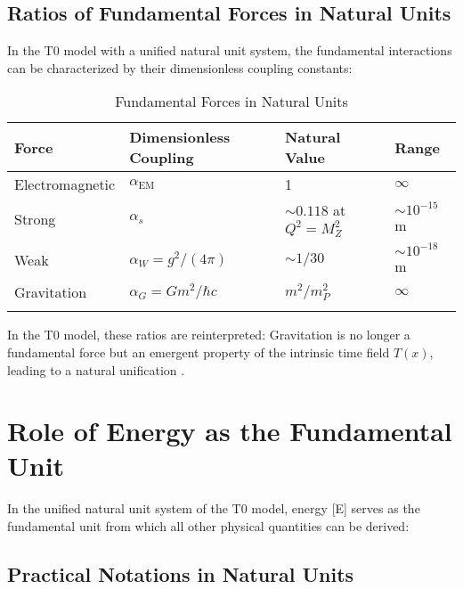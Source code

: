 \documentclass[12pt,a4paper]{article}
\newcommand{\Tfield}{T(x)}
\newcommand{\alphaEM}{\alpha_{\text{EM}}}
\begin{document}
	\subsection{Ratios of Fundamental Forces in Natural Units}
	
	In the T0 model with a unified natural unit system, the fundamental interactions can be characterized by their dimensionless coupling constants:
	
	\begin{table}[ht]
		\centering
		\begin{adjustbox}{scale=0.95}
			\begin{tabular}{llll}
				\hline
				\textbf{Force} & \textbf{Dimensionless Coupling} & \textbf{Natural Value} & \textbf{Range} \\
				\hline
				Electromagnetic & $\alphaEM$ & 1 & $\infty$ \\
				Strong & $\alpha_s$ & $\sim 0.118$ at $Q^2=M_Z^2$ & $\sim 10^{-15}$ m \\
				Weak & $\alpha_W = g^2/(4\pi)$ & $\sim 1/30$ & $\sim 10^{-18}$ m \\
				Gravitation & $\alpha_G = Gm^2/\hbar c$ & $m^2/m_P^2$ & $\infty$ \\
				\hline
				\multicolumn{3}{c}{} \\
				\hline
			\end{tabular}
		\end{adjustbox}
		\caption{Fundamental Forces in Natural Units}
		\label{tab:forces}
	\end{table}
	
	In the T0 model, these ratios are reinterpreted: Gravitation is no longer a fundamental force but an emergent property of the intrinsic time field $\Tfield$, leading to a natural unification \cite{pascher_grundkraefte_2025}.
	
	\section{Role of Energy as the Fundamental Unit}
	
	In the unified natural unit system of the T0 model, energy [E] serves as the fundamental unit from which all other physical quantities can be derived:
	
	\subsection{Practical Notations in Natural Units}
	
\end{document}
